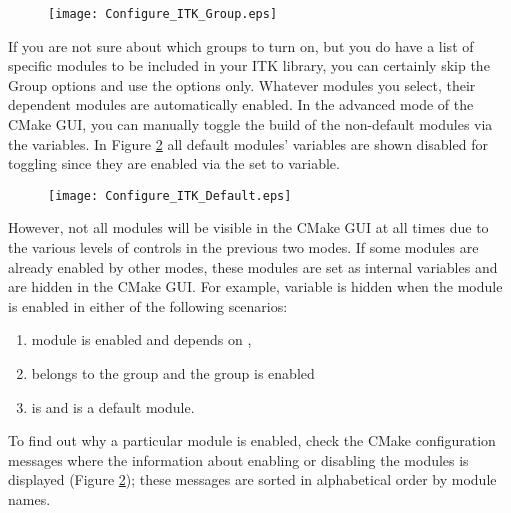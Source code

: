 \begin{figure}[htb!]
\centering
\texttt{[image: Configure\_ITK\_Group.eps]}
\label{fig:ConfigITKGroup}
\end{figure}

If you are not sure about which groups to turn on, but you do have a list of
specific modules to be included in your ITK library, you can certainly skip the
Group options and use the  options only. Whatever
modules you select, their dependent modules are automatically enabled. In the
advanced mode of the CMake GUI, you can manually toggle the build of the
non-default modules via the  variables. In Figure
\ref{fig:ConfigITKDefault} all default modules' 
variables are shown disabled for toggling since they are enabled via the
 set to  variable.

\begin{figure}[htb!]
\centering
\texttt{[image: Configure\_ITK\_Default.eps]}
\label{fig:ConfigITKDefault}
\end{figure}

However, not all modules will be visible in the CMake GUI at all times due to
the various levels of controls in the previous two modes. If some modules are
already enabled by other modes, these modules are set as internal variables and
are hidden in the CMake GUI. For example,  variable is
hidden when the module  is enabled in either of the following
scenarios:
\begin{enumerate}
\item module  is enabled and depends on ,
\item {} belongs to the group  and the
group is enabled
\item {} is  and  is a
default module.
\end{enumerate}

To find out why a particular module is enabled, check the CMake configuration
messages where the information about enabling or disabling the modules is
displayed (Figure \ref{fig:ConfigITKDefault}); these messages are sorted in
alphabetical order by module names.

